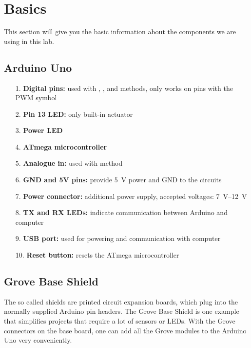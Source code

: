 \newpage
\section{Basics}
This section will give you the basic information about the components we are using in this lab.

\subsection{Arduino Uno}

\begin{itemize}
	\item[1.] \textbf{Digital pins:} 			used with , , and  methods,  only works on pins with the PWM symbol
	\item[2.] \textbf{Pin 13 LED:} 				only built-in actuator
	\item[3.] \textbf{Power LED}
	\item[4.] \textbf{ATmega microcontroller}
	\item[5.] \textbf{Analogue in:} 			used with  method
	\item[6.] \textbf{GND and 5V pins:} 	provide \SI[retain-explicit-plus]{5}{\volt} power and \ac{GND} to the circuits
	\item[7.] \textbf{Power connector:} 	additional power supply, accepted voltages: \SIrange{7}{12}{\volt}
	\item[8.] \textbf{TX and RX LEDs:} 		indicate communication between Arduino and computer
	\item[9.] \textbf{USB port:} used 		for powering and communication with computer
	\item[10.] \textbf{Reset button:}			resets the ATmega microcontroller
\end{itemize}

\subsection{Grove Base Shield}
The so called shields are printed circuit expansion boards, which plug into the normally supplied Arduino pin headers. The Grove Base Shield is one example that simplifies projects that require a lot of sensors or LEDs. With the Grove connectors on the base board, one can add all the Grove modules to the Arduino Uno very conveniently.\par

